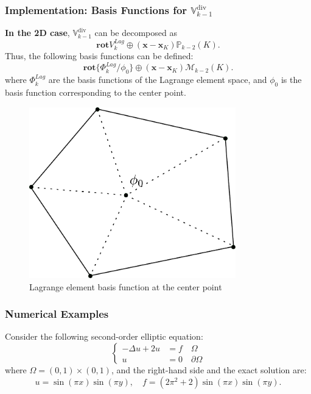 \documentclass[notheorems,serif]{beamer}
\begin{document}
\begin{CJK}{UTF8}{gkai}
\begin{frame}
    \frametitle{Implementation: Basis Functions for $\mathbb{V}^{\mathrm{div}}_{k-1}$}
    \begin{minipage}[b]{0.55\linewidth}
    \textbf{In the 2D case}, 
    $\mathbb{V}^{\mathrm{div}}_{k-1}$ can be decomposed as
    $$
    \mathbf{rot} V^{Lag}_k \oplus (\mathbf{x-x}_K)\mathbb{P}_{k-2}(K). 
    $$
    Thus, the following basis functions can be defined:
    $$
    \mathbf{rot} \{\Phi^{Lag}_k/\phi_0\} \oplus (\mathbf{x-x}_K)
    \mathcal{M}_{k-2}(K).
    $$
    where $\Phi^{Lag}_k$ are the basis functions of the Lagrange element space, and $\phi_0$
    is the basis function corresponding to the center point.
\end{minipage}
\hfill
\begin{minipage}[b]{0.4\linewidth}
    \centering
    \begin{figure}[htpb]
        \centering
        \includegraphics[width=0.8\textwidth]{../figures/lagrange_phi0.pdf}
        \caption{Lagrange element basis function at the center point}
    \end{figure}
\vspace{5pt}
\end{minipage}
\end{frame}

\begin{frame}
\frametitle{Numerical Examples}
Consider the following second-order elliptic equation:
$$
\left\{
\begin{aligned}
    -\Delta u + 2u & = f \quad \Omega \\
    u & = 0 \quad \partial\Omega
\end{aligned}
\right.
$$
where $\Omega = (0, 1)\times(0, 1)$, and the right-hand side and the exact solution are:
$$
u = \sin(\pi x)\sin(\pi y), \quad f = (2\pi^2+2)\sin(\pi x)\sin(\pi y).
$$


\end{frame}
\end{CJK}
\end{document}
